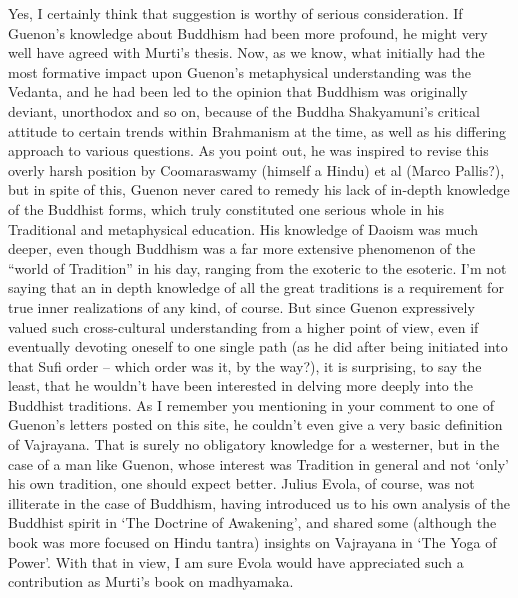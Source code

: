\begin{footnotesize}
\begin{sffamily}
Yes, I certainly think that suggestion is worthy of serious consideration. If Guenon's knowledge about Buddhism had been more profound, he might very well have agreed with Murti's thesis. Now, as we know, what initially had the most formative impact upon Guenon's metaphysical understanding was the Vedanta, and he had been led to the opinion that Buddhism was originally deviant, unorthodox and so on, because of the Buddha Shakyamuni's critical attitude to certain trends within Brahmanism at the time, as well as his differing approach to various questions. As you point out, he was inspired to revise this overly harsh position by Coomaraswamy (himself a Hindu) et al (Marco Pallis?), but in spite of this, Guenon never cared to remedy his lack of in-depth knowledge of the Buddhist forms, which truly constituted one serious whole in his Traditional and metaphysical education. His knowledge of Daoism was much deeper, even though Buddhism was a far more extensive phenomenon of the ``world of Tradition'' in his day, ranging from the exoteric to the esoteric. I'm not saying that an in depth knowledge of all the great traditions is a requirement for true inner realizations of any kind, of course. But since Guenon expressively valued such cross-cultural understanding from a higher point of view, even if eventually devoting oneself to one single path (as he did after being initiated into that Sufi order -- which order was it, by the way?), it is surprising, to say the least, that he wouldn't have been interested in delving more deeply into the Buddhist traditions. As I remember you mentioning in your comment to one of Guenon's letters posted on this site, he couldn't even give a very basic definition of Vajrayana. That is surely no obligatory knowledge for a westerner, but in the case of a man like Guenon, whose interest was Tradition in general and not `only' his own tradition, one should expect better. Julius Evola, of course, was not illiterate in the case of Buddhism, having introduced us to his own analysis of the Buddhist spirit in `The Doctrine of Awakening', and shared some (although the book was more focused on Hindu tantra) insights on Vajrayana in `The Yoga of Power'. With that in view, I am sure Evola would have appreciated such a contribution as Murti's book on madhyamaka.


\end{sffamily}
\end{footnotesize}
